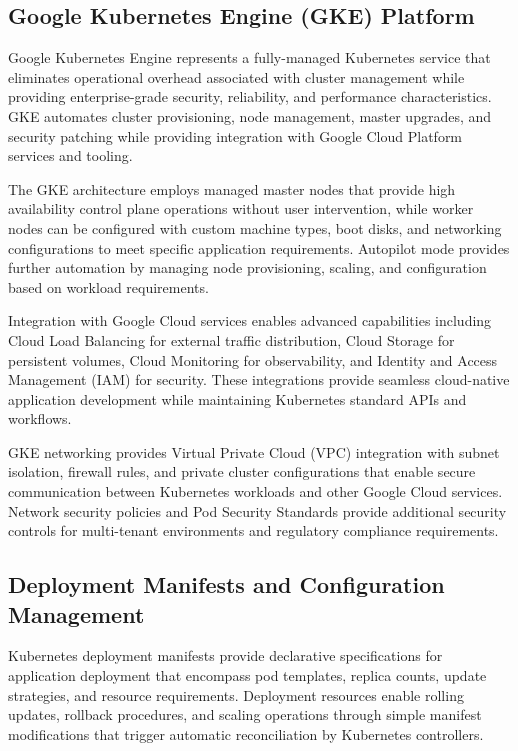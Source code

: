 \subsection{Google Kubernetes Engine (GKE) Platform}

Google Kubernetes Engine represents a fully-managed Kubernetes service that eliminates operational overhead associated with cluster management while providing enterprise-grade security, reliability, and performance characteristics. GKE automates cluster provisioning, node management, master upgrades, and security patching while providing integration with Google Cloud Platform services and tooling.

The GKE architecture employs managed master nodes that provide high availability control plane operations without user intervention, while worker nodes can be configured with custom machine types, boot disks, and networking configurations to meet specific application requirements. Autopilot mode provides further automation by managing node provisioning, scaling, and configuration based on workload requirements.

Integration with Google Cloud services enables advanced capabilities including Cloud Load Balancing for external traffic distribution, Cloud Storage for persistent volumes, Cloud Monitoring for observability, and Identity and Access Management (IAM) for security. These integrations provide seamless cloud-native application development while maintaining Kubernetes standard APIs and workflows.

GKE networking provides Virtual Private Cloud (VPC) integration with subnet isolation, firewall rules, and private cluster configurations that enable secure communication between Kubernetes workloads and other Google Cloud services. Network security policies and Pod Security Standards provide additional security controls for multi-tenant environments and regulatory compliance requirements.

\subsection{Deployment Manifests and Configuration Management}

Kubernetes deployment manifests provide declarative specifications for application deployment that encompass pod templates, replica counts, update strategies, and resource requirements. Deployment resources enable rolling updates, rollback procedures, and scaling operations through simple manifest modifications that trigger automatic reconciliation by Kubernetes controllers.

